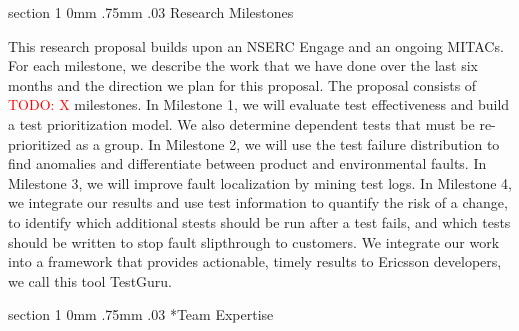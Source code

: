 \documentclass[12pt, letterpaper]{article}
\makeatletter
\newcommand{\todo}[1]{\textcolor{red}{TODO: #1}\PackageWarning{TODO:}{#1!}}
\renewcommand{\section}{\@startsection
{section}%
{1}%
{0mm}%
{.75mm}
{.03\baselineskip}%
{\normalfont\large\bf} %
}
\makeatother
\begin{document}
\fancyhead{}
\pagestyle{fancy}
\renewcommand{\headrulewidth}{0pt}

\begin{center}
\begin{LARGE}
\noindent
{}
\end{LARGE}
\end{center}






\section{Research Milestones} 

This research proposal builds upon an NSERC Engage and an ongoing MITACs. For
each milestone, we describe the work that we have done over the last six months
and the direction we plan for this proposal. The proposal consists of \todo{X}
milestones. In Milestone 1, we will evaluate test effectiveness and build a
test prioritization model. We also determine dependent tests that must be re-prioritized as a group. In Milestone 2, we will use the test failure
distribution to find anomalies and differentiate between product and
environmental faults. In Milestone 3, we will improve fault localization by
mining test logs. In Milestone 4, we integrate our results and use test
information to quantify the risk of a change, to identify which additional
stests should be run after a test fails, and which tests should be written to
stop fault slipthrough to customers.  We integrate our work into a framework
that provides actionable, timely results to Ericsson developers, we call this
tool TestGuru.









\section*{Team Expertise}
\end{document}
